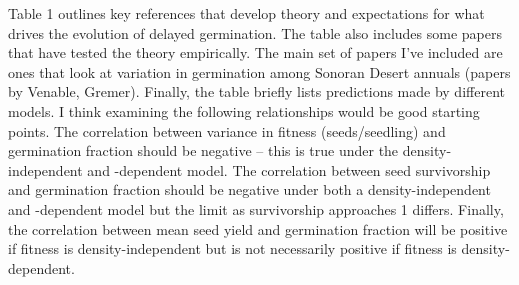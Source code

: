 \documentclass[12pt, oneside, titlepage]{article}   	%
\begin{document}
Table 1 outlines key references that develop theory and expectations for what drives the evolution of delayed germination. The table also includes some papers that have tested the theory empirically. The main set of papers I've included are ones that look at variation in germination among Sonoran Desert annuals (papers by Venable, Gremer). Finally, the table briefly lists predictions made by different models. I think examining the following relationships would be good starting points. The correlation between variance in fitness (seeds/seedling) and germination fraction should be negative -- this is true under the density-independent and -dependent model. The correlation between seed survivorship and germination fraction should be negative under both a density-independent and -dependent model but the limit as survivorship approaches 1 differs. Finally, the correlation between mean seed yield and germination fraction will be positive if fitness is density-independent but is not necessarily positive if fitness is density-dependent.
\end{document}
